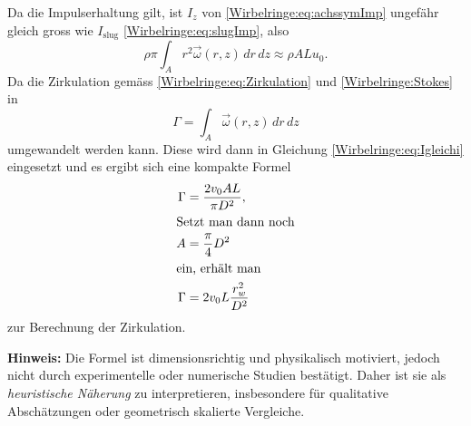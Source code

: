 Da die Impulserhaltung gilt, ist \(I_z\) von \eqref{Wirbelringe:eq:achssymImp} ungefähr gleich gross wie \(I_{\text{slug}}\) \eqref{Wirbelringe:eq:slugImp}, also
\begin{equation}
    \rho\pi\int_{A}r^2\vec{\omega}(r,z)\,dr\,dz
    \approx
    \rho ALu_0
    \label{Wirbelringe:eq:Igleichi}.
\end{equation}
Da die Zirkulation gemäss \eqref{Wirbelringe:eq:Zirkulation} und \ref{Wirbelringe:Stokes} in
\begin{equation*}
    \Gamma
    =
    \int_{A}\vec{\omega}(r,z)\,dr\,dz
\end{equation*}
umgewandelt werden kann.
Diese wird dann in Gleichung \eqref{Wirbelringe:eq:Igleichi} eingesetzt und es ergibt sich eine kompakte Formel
\begin{align*}
    \Gamma
    &=
    \frac{2v_0AL}{\pi D^2},\\
    \intertext{Setzt man dann noch} 
    A
    &=
    \frac{\pi}{4} D^2\\
    \intertext{ein, erhält man }
    \label{Wirbelringe:eq:naeherungZirkulation}
    \Gamma
    &=
    2v_0L\frac{r_w^2}{D^2}
\end{align*}
zur Berechnung der Zirkulation.

\textbf{Hinweis:}
Die Formel ist dimensionsrichtig und physikalisch motiviert, jedoch nicht durch experimentelle oder numerische Studien bestätigt.
Daher ist sie als \emph{heuristische Näherung} zu interpretieren, insbesondere für qualitative Abschätzungen oder geometrisch skalierte Vergleiche.